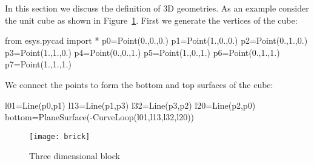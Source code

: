 In this section we discuss the definition of 3D geometries. As an example
consider the unit cube as shown in Figure~\ref{fig:PYCAD 2}.
First we generate the vertices of the cube:
\begin{python}
  from esys.pycad import *
  p0=Point(0.,0.,0.)
  p1=Point(1.,0.,0.)
  p2=Point(0.,1.,0.)
  p3=Point(1.,1.,0.)
  p4=Point(0.,0.,1.)
  p5=Point(1.,0.,1.)
  p6=Point(0.,1.,1.)
  p7=Point(1.,1.,1.)
\end{python}

We connect the points to form the bottom and top surfaces of the cube:
\begin{python}
  l01=Line(p0,p1)
  l13=Line(p1,p3)
  l32=Line(p3,p2)
  l20=Line(p2,p0)
  bottom=PlaneSurface(-CurveLoop(l01,l13,l32,l20))
\end{python}

\begin{figure}
\centerline{\texttt{[image: brick]}}
\caption{Three dimensional block}
\label{fig:PYCAD 2}
\end{figure}

